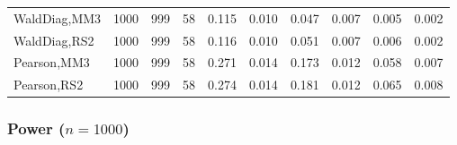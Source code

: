 \documentclass[
]{article}
\begin{document}
\begin{table}[H]
{\begin{tabular}[t]{lrrrrrrlrr}
\hspace{1em}WaldDiag,MM3 & 1000 & 999 & 58 & 0.115 & 0.010 & 0.047 & 0.007 & 0.005 & 0.002\\
\hspace{1em}WaldDiag,RS2 & 1000 & 999 & 58 & 0.116 & 0.010 & 0.051 & 0.007 & 0.006 & 0.002\\
\hspace{1em}Pearson,MM3 & 1000 & 999 & 58 & 0.271 & 0.014 & 0.173 & 0.012 & 0.058 & 0.007\\
\hspace{1em}Pearson,RS2 & 1000 & 999 & 58 & 0.274 & 0.014 & 0.181 & 0.012 & 0.065 & 0.008\\
\bottomrule
\end{tabular}}
\endgroup{}
\end{table}

\hypertarget{power-n1000-2}{%
\subsubsection{\texorpdfstring{Power
(\(n=1000\))}{Power (n=1000)}}\label{power-n1000-2}}
\end{document}
